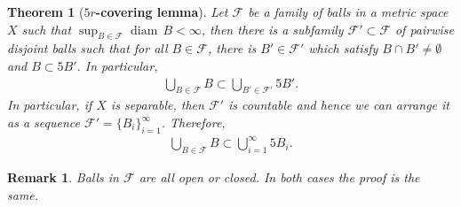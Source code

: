 \documentclass[11pt]{book}
\newtheorem{theorem}{Theorem}[chapter]
\newtheorem{remark}{Remark}[chapter]
\theoremstyle{definition}
\numberwithin{equation}{chapter}
\def\diam{{\operatorname{diam}\,}}
\begin{document}
\begin{theorem}[{\bf $5r$-covering lemma}]\label{theorem_54}
Let $\mathcal{F}$ be a family of balls in a metric space $X$ such that $\sup_{B \in \mathcal{F}} \diam B < \infty$, then there is a subfamily $\mathcal{F}' \subset \mathcal{F}$ of pairwise disjoint balls such that for all $B \in \mathcal{F}$, there is $B' \in \mathcal{F}'$ which satisfy $B \cap B' \neq \emptyset$ and $B \subset 5B'$. In particular,
\begin{align*}
    \bigcup_{B \in \mathcal{F}} B \subset \bigcup_{B' \in \mathcal{F}'} 5B'.
\end{align*}
In particular, if $X$ is separable, then $\mathcal{F}'$ is countable and hence we can arrange it as a sequence $\mathcal{F}' = \{B_i\}^\infty_{i=1}$. Therefore,
\begin{align*}
        \bigcup_{B \in \mathcal{F}} B \subset \bigcup^\infty_{i=1} 5B_i.
    \end{align*}
\end{theorem}

\begin{remark}
Balls in $\mathcal{F}$ are all open or closed. In both cases the proof is the same.
\end{remark}
\end{document}
